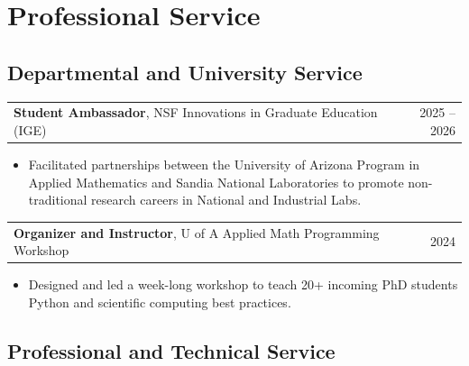 \documentclass[a4paper,12pt]{article}
\begin{document}
\section*{Professional Service}

\subsection*{Departmental and University Service}
\enlargethispage{3\baselineskip}


\begin{tabularx}{\linewidth}{@{}X r@{}}
\textbf{Student Ambassador}, NSF Innovations in Graduate Education (IGE) & 2025 -- 2026 \\
\end{tabularx}
\begin{itemize}[nosep, leftmargin=1em, itemsep=3pt, label=--]
    \item Facilitated partnerships between the University of Arizona Program in Applied Mathematics and Sandia National Laboratories to promote non-traditional research careers in National and Industrial Labs.
\end{itemize}

\vspace{2pt}

\begin{tabularx}{\linewidth}{@{}X r@{}}
\textbf{Organizer and Instructor}, U of A Applied Math Programming Workshop & 2024 \\
\end{tabularx}
\begin{itemize}[nosep, leftmargin=1em, itemsep=3pt, label=--]
    \item Designed and led a week-long workshop to teach 20+ incoming PhD students Python and scientific computing best practices.
\end{itemize}

\subsection*{Professional and Technical Service}

\end{document}
